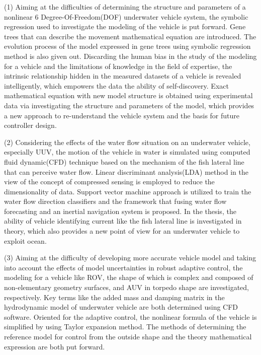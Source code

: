 \begin{englishabstract}
(1) Aiming at the difficulties of determining the structure and parameters of a nonlinear 6 Degree-Of-Freedom(DOF) underwater vehicle system, the symbolic regression used to investigate the modeling of the vehicle is put forward. Gene trees that can describe the movement mathematical equation are introduced. The evolution process of the model expressed in gene trees using symbolic regression method is also given out. Discarding the human bias in the study of the modeling for a vehicle and the limitations of knowledge in the field of expertise, the intrinsic relationship hidden in the measured datasets of a vehicle is revealed intelligently, which empowers the data the ability of self-discovery. Exact mathematical equation with new model structure is obtained using experimental data via investigating the structure and parameters of the model, which provides a new approach to re-understand the vehicle system and the basis for future controller design.

(2) Considering the effects of the water flow situation on an underwater vehicle, especially UUV, the motion of the vehicle in water is simulated using computed fluid dynamic(CFD) technique based on the mechanism of the fish lateral line that can perceive water flow. Linear discriminant analysis(LDA) method in the view of the concept of compressed sensing is employed to reduce the dimensionality of data. Support vector machine approach is utilized to train the water flow direction classifiers and the framework that fusing water flow forecasting and an inertial navigation system is proposed. In the thesis, the ability of vehicle identifying current like the fish lateral line is investigated in theory, which also provides a new point of view for an underwater vehicle to exploit ocean.

(3) Aiming at the difficulty of developing more accurate vehicle model and taking into account the effects of model uncertainties in robust adaptive control, the modeling for a vehicle like ROV, the shape of which is complex and composed of non-elementary geometry surfaces, and AUV in torpedo shape are investigated, respectively. Key terms like the added mass and damping matrix in the hydrodynamic model of underwater vehicle are both determined using CFD software. Oriented for the adaptive control, the nonlinear formula of the vehicle is simplified by using Taylor expansion method. The methods of determining the reference model for control from the outside shape and the theory mathematical expression are both put forward.


\end{englishabstract}
